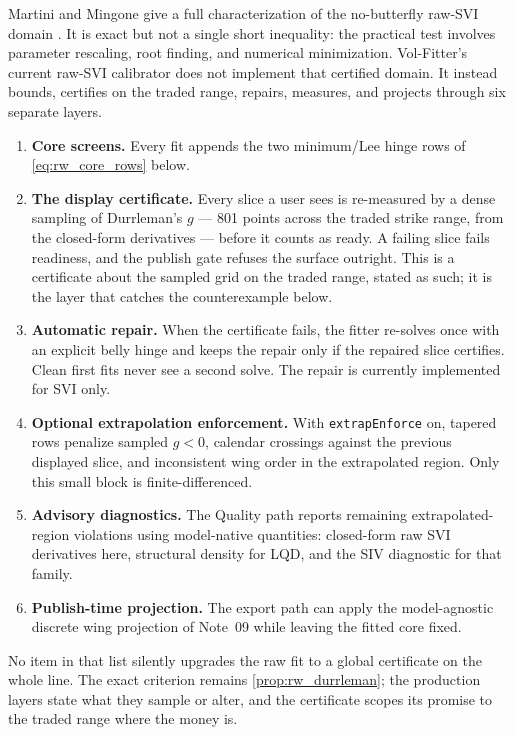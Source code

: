 \documentclass[11pt]{article}
\begin{document}
Martini and Mingone give a full characterization of the no-butterfly raw-SVI
domain \cite{MartiniMingone2022}.  It is exact but not a single short inequality:
the practical test involves parameter rescaling, root finding, and numerical
minimization.  Vol-Fitter's current raw-SVI calibrator does not implement that
certified domain.  It instead bounds, certifies on the traded range, repairs,
measures, and projects through six separate layers.

\begin{enumerate}[leftmargin=1.6em]
\item \textbf{Core screens.}  Every fit appends the two minimum/Lee hinge rows
of \eqref{eq:rw_core_rows} below.
\item \textbf{The display certificate.}  Every slice a user sees is
re-measured by a dense sampling of Durrleman's $g$ --- 801 points across the
traded strike range, from the closed-form derivatives --- before it counts as
ready.  A failing slice fails readiness, and the publish gate refuses the
surface outright.  This is a certificate about the sampled grid on the traded
range, stated as such; it is the layer that catches the counterexample below.
\item \textbf{Automatic repair.}  When the certificate fails, the fitter
re-solves once with an explicit belly hinge and keeps the repair only if the
repaired slice certifies.  Clean first fits never see a second solve.  The
repair is currently implemented for SVI only.
\item \textbf{Optional extrapolation enforcement.}  With
\texttt{extrapEnforce} on, tapered rows penalize sampled $g<0$, calendar
crossings against the previous displayed slice, and inconsistent wing order in
the extrapolated region.  Only this small block is finite-differenced.
\item \textbf{Advisory diagnostics.}  The Quality path reports remaining
extrapolated-region violations using model-native quantities: closed-form raw
SVI derivatives here, structural density for LQD, and the SIV diagnostic for
that family.
\item \textbf{Publish-time projection.}  The export path can apply the
model-agnostic discrete wing projection of Note~09 while leaving the fitted core
fixed.
\end{enumerate}

No item in that list silently upgrades the raw fit to a global certificate on
the whole line.  The exact criterion remains \cref{prop:rw_durrleman}; the
production layers state what they sample or alter, and the certificate scopes
its promise to the traded range where the money is.
\end{document}
